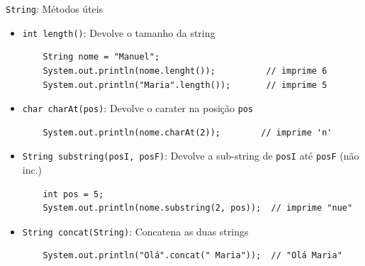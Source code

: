 \documentclass[portuguese, aspectratio=169, xcolor=table]{beamer}
\begin{document}
\begin{frame}[fragile]{\texttt{String}: Métodos úteis}
\begin{itemize}
\item \texttt{int length()}: Devolve o tamanho da string
\begin{verbatim}
    String nome = "Manuel";
    System.out.println(nome.lenght());          // imprime 6
    System.out.println("Maria".length());       // imprime 5
\end{verbatim}
\item \texttt{char charAt(pos)}: Devolve o carater na posição \texttt{pos}
\begin{verbatim}
    System.out.println(nome.charAt(2));        // imprime 'n'
\end{verbatim}

\item \texttt{String substring(posI, posF)}: Devolve a sub-string de \texttt{posI} até \texttt{posF} (não inc.)
\begin{verbatim}
    int pos = 5;
    System.out.println(nome.substring(2, pos));  // imprime "nue"
\end{verbatim}

\item \texttt{String concat(String)}: Concatena as duas strings
\begin{verbatim}
    System.out.println("Olá".concat(" Maria"));  // "Olá Maria"
\end{verbatim}
\end{itemize}
\end{frame}
\end{document}
